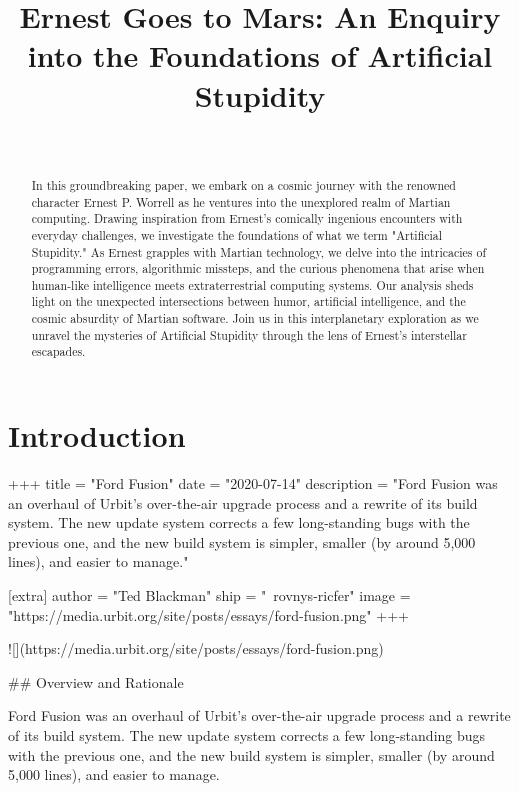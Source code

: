 \documentclass[twoside]{article}
\title{Ernest Goes to Mars:  An Enquiry into the Foundations of Artificial Stupidity}
\author{\authorname~\authorpatp \\ \affiliation}
\date{}
\begin{document}
\maketitle
\thispagestyle{firststyle}

\begin{abstract}
In this groundbreaking paper, we embark on a cosmic journey with the renowned character Ernest P. Worrell as he ventures into the unexplored realm of Martian computing. Drawing inspiration from Ernest's comically ingenious encounters with everyday challenges, we investigate the foundations of what we term "Artificial Stupidity." As Ernest grapples with Martian technology, we delve into the intricacies of programming errors, algorithmic missteps, and the curious phenomena that arise when human-like intelligence meets extraterrestrial computing systems. Our analysis sheds light on the unexpected intersections between humor, artificial intelligence, and the cosmic absurdity of Martian software. Join us in this interplanetary exploration as we unravel the mysteries of Artificial Stupidity through the lens of Ernest's interstellar escapades.
\end{abstract}

\setcounter{page}{1}

\tableofcontents

\section{Introduction}

+++
title = "Ford Fusion"
date = "2020-07-14"
description = "Ford Fusion was an overhaul of Urbit's over-the-air upgrade process and a rewrite of its build system. The new update system corrects a few long-standing bugs with the previous one, and the new build system is simpler, smaller (by around 5,000 lines), and easier to manage."

[extra]
author = "Ted Blackman"
ship = "~rovnys-ricfer"
image = "https://media.urbit.org/site/posts/essays/ford-fusion.png"
+++

![](https://media.urbit.org/site/posts/essays/ford-fusion.png)

## Overview and Rationale

Ford Fusion was an overhaul of Urbit's over-the-air upgrade process and a rewrite of its build system. The new update system corrects a few long-standing bugs with the previous one, and the new build system is simpler, smaller (by around 5,000 lines), and easier to manage.
\end{document}
